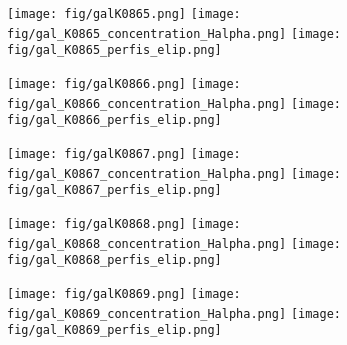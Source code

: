 \begin{figure}[!ht]
\begin{center}
\setcaptionmargin{1cm}
\texttt{[image: fig/galK0865.png]}
\texttt{[image: fig/gal\_K0865\_concentration\_Halpha.png]}
\texttt{[image: fig/gal\_K0865\_perfis\_elip.png]}
\end{center}
\end{figure}


\begin{figure}[!ht]
\begin{center}
\setcaptionmargin{1cm}
\texttt{[image: fig/galK0866.png]}
\texttt{[image: fig/gal\_K0866\_concentration\_Halpha.png]}
\texttt{[image: fig/gal\_K0866\_perfis\_elip.png]}
\end{center}
\end{figure}


\begin{figure}[!ht]
\begin{center}
\setcaptionmargin{1cm}
\texttt{[image: fig/galK0867.png]}
\texttt{[image: fig/gal\_K0867\_concentration\_Halpha.png]}
\texttt{[image: fig/gal\_K0867\_perfis\_elip.png]}
\end{center}
\end{figure}


\begin{figure}[!ht]
\begin{center}
\setcaptionmargin{1cm}
\texttt{[image: fig/galK0868.png]}
\texttt{[image: fig/gal\_K0868\_concentration\_Halpha.png]}
\texttt{[image: fig/gal\_K0868\_perfis\_elip.png]}
\end{center}
\end{figure}


\begin{figure}[!ht]
\begin{center}
\setcaptionmargin{1cm}
\texttt{[image: fig/galK0869.png]}
\texttt{[image: fig/gal\_K0869\_concentration\_Halpha.png]}
\texttt{[image: fig/gal\_K0869\_perfis\_elip.png]}
\end{center}
\end{figure}


